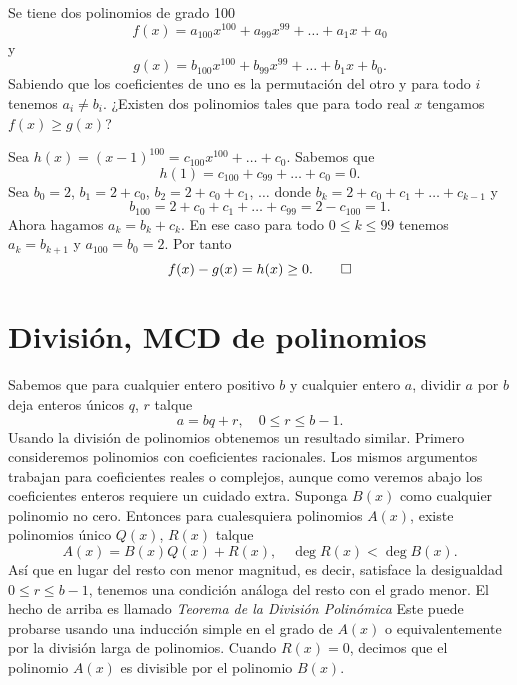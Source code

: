 \begin{example}
    Se tiene dos polinomios de grado 100
    \[
        f(x) = a_{100} x^{100} + a_{99} x^{99} + \ldots + a_1 x + a_0
    \]
    y
    \[
        g(x) = b_{100} x^{100} + b_{99} x^{99} + \ldots + b_1 x + b_0.
    \]
    Sabiendo que los coeficientes de uno es la permutación del otro y para todo $i$ tenemos $a_i \neq b_i$.
    ¿Existen dos polinomios tales que para todo real $x$ tengamos $f(x) \geq g(x)$?
\end{example}
\begin{solution}
    Sea $h(x) = (x - 1)^{100} = c_{100} x^{100} + \ldots + c_0$.
    Sabemos que
    \[
        h(1) = c_{100} + c_{99} + \ldots + c_0 = 0.
    \]
    Sea $b_0 = 2$, $b_1 = 2 + c_0$, $b_2 = 2 + c_0 + c_1$, $\ldots$ donde $b_k = 2 + c_0 + c_1 + \ldots + c_{k - 1}$ y
    \[
        b_{100} = 2 + c_0 + c_1 + \ldots + c_{99} = 2 - c_{100} = 1.
    \]
    Ahora hagamos $a_k = b_k + c_k$.
    En ese caso para todo $0 \leq k \leq 99$ tenemos $a_k = b_{k + 1}$ y $a_{100} = b_0 = 2$.
    Por tanto
    \[
        f(x) - g(x) = h(x) \geq 0. \qedhere
    \]
\end{solution}




\section{División, MCD de polinomios}

Sabemos que para cualquier entero positivo $b$ y cualquier entero $a$, dividir $a$ por $b$ deja enteros únicos $q$, $r$ talque
\[
    a = bq + r, \quad 0 \leq r \leq b - 1.
\]
Usando la división de polinomios obtenemos un resultado similar.
Primero consideremos polinomios con coeficientes racionales.
Los mismos argumentos trabajan para coeficientes reales o complejos, aunque como veremos abajo los coeficientes enteros requiere un cuidado extra.
Suponga $B(x)$ como cualquier polinomio no cero.
Entonces para cualesquiera polinomios $A(x)$, existe polinomios único $Q(x)$, $R(x)$ talque
\[
    A(x) = B(x) Q(x) + R(x), \quad \deg{R(x)} < \deg{B(x)}.
\]
Así que en lugar del resto con menor magnitud, es decir, satisface la desigualdad $0 \leq r \leq b - 1$, tenemos una condición análoga del resto con el grado menor.
El hecho de arriba es llamado \textit{Teorema de la División Polinómica}
Este puede probarse usando una inducción simple en el grado de $A(x)$ o equivalentemente por la división larga de polinomios.
Cuando $R(x) = 0$, decimos que el polinomio $A(x)$ es divisible por el polinomio $B(x)$.

